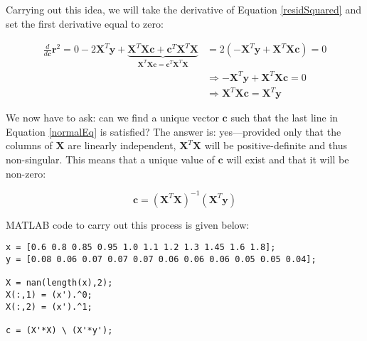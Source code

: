 Carrying out this idea, we will take the derivative of Equation
\ref{residSquared} and set the first derivative equal to zero:

\begin{equation}
\begin{split}
\frac{d}{d\mathbf{c}}\mathbf{r}^{2} = 0  - 2\mathbf{X}^{T}\mathbf{y} + \underbrace{\mathbf{X}^{T}\mathbf{X}\mathbf{c} + \mathbf{c}^{T}\mathbf{X}^{T}\mathbf{X}}_{\mathbf{X}^{T}\mathbf{X}\mathbf{c} = \mathbf{c}^{T}\mathbf{X}^{T}\mathbf{X}} &= 2\left(-\mathbf{X}^{T}\mathbf{y}+
\mathbf{X}^{T}\mathbf{X} \mathbf{c}\right) = 0 \\
&\Rightarrow -\mathbf{X}^{T}\mathbf{y} + \mathbf{X}^{T}\mathbf{X}\mathbf{c} =
0 \\
&\Rightarrow \mathbf{X}^{T}\mathbf{X} \mathbf{c} = \mathbf{X}^{T}\mathbf{y}
\end{split}
\label{normalEq}
\end{equation}

We now have to ask: can we find a unique vector $\mathbf{c}$ such that the
last line in Equation \ref{normalEq} is satisfied?  The answer is:
yes---provided only that the columns of $\mathbf{X}$ are linearly
independent, $\mathbf{X}^{T}\mathbf{X}$ will be positive-definite and thus non-singular.  This means that a unique value of $\mathbf{c}$
will exist and that it will be non-zero:

\begin{equation}
\mathbf{c} = \left(\mathbf{X}^{T}\mathbf{X}\right)^{-1}
\left(\mathbf{X}^{T}\mathbf{y}\right)
\label{lstSqSol}
\end{equation} 


MATLAB code to carry out this process is given below:

\begin{lstlisting}[style=myMatlab]
x = [0.6 0.8 0.85 0.95 1.0 1.1 1.2 1.3 1.45 1.6 1.8]; 
y = [0.08 0.06 0.07 0.07 0.07 0.06 0.06 0.06 0.05 0.05 0.04]; 

X = nan(length(x),2);
X(:,1) = (x').^0;
X(:,2) = (x').^1;

c = (X'*X) \ (X'*y');
\end{lstlisting}

